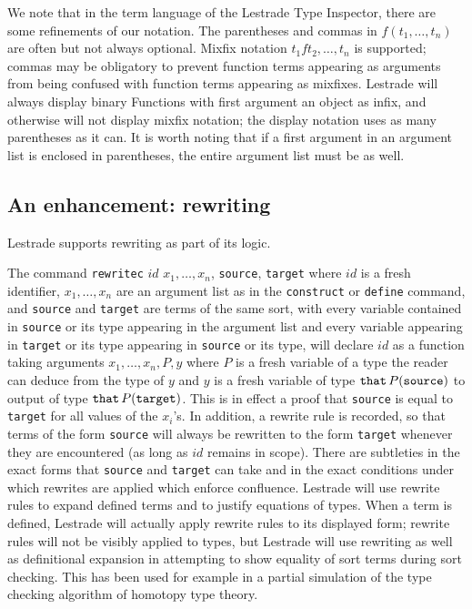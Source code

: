 \documentclass{article}
\begin{document}
We note that in the term language of the Lestrade Type Inspector, there are some refinements of our notation.  The parentheses and commas in $f(t_1,\ldots,t_n)$ are often but not always optional.  Mixfix notation $t_1 f t_2,\ldots,t_n$ is supported; commas may be obligatory to prevent function terms appearing as arguments from being confused with function terms appearing as mixfixes.  Lestrade will always display binary Functions with first argument an object as infix, and otherwise will not display mixfix notation;  the display notation uses as many parentheses as it can.  It is worth noting that if a first argument in an argument list is enclosed in parentheses, the entire argument list must be as well.

\subsection{An enhancement: rewriting}

Lestrade supports rewriting as part of its logic.

The command {\tt rewritec} $id$ $x_1, \ldots, x_n$, {\tt source}, {\tt target}  where $id$ is a fresh identifier, $x_1, \ldots, x_n$ are an argument list as in the {\tt construct} or {\tt define} command, and {\tt source} and {\tt target} are terms of the same sort, with every variable contained in {\tt source} or its type appearing in the argument list and every variable appearing in {\tt target} or its type appearing in {\tt source} or its type, will declare $id$ as a function taking arguments $x_1,\ldots,x_n,P,y$ where $P$ is a fresh variable of a type the reader can deduce from the type of $y$ and $y$ is a fresh variable of type
${\tt that} \,P({\tt source})$ to output of type ${\tt that}\, P({\tt target})$.  This is in effect a proof that {\tt source} is equal to {\tt target} for all values of the $x_i$'s.  In addition, a rewrite rule is recorded, so that terms of the form {\tt source} will always be rewritten to the form {\tt target} whenever they are encountered (as long as $id$ remains in scope).  There are subtleties in the exact forms that {\tt source} and {\tt target} can take and in the exact conditions under which rewrites are applied which enforce confluence.  Lestrade will use rewrite rules to expand defined terms and to justify equations of types.   When a term is defined, Lestrade will actually apply rewrite rules to its displayed form;  rewrite rules will not be visibly applied to types, but Lestrade will use rewriting as well as definitional expansion in attempting to show equality of sort terms during sort checking.   This has been used for example in a partial simulation of the type checking algorithm of homotopy type theory. 
\end{document}
